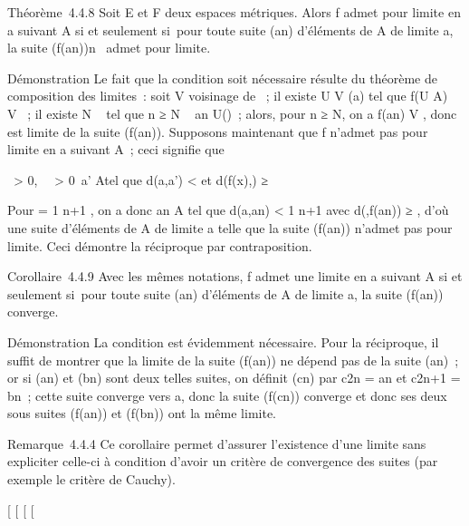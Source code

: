 Théorème~4.4.8 Soit E et F deux espaces métriques. Alors f admet \ell pour
limite en a suivant A si et seulement si~pour toute suite (an)
d'éléments de A de limite a, la suite (f(an))n\in{}~
admet \ell pour limite.

Démonstration Le fait que la condition soit nécessaire résulte du
théorème de composition des limites~: soit V voisinage de \ell~; il existe
U \in V (a) tel que f(U \bigcap A) \subset~ V ~; il existe N \in {}~ tel que n ≥ N \rigtharrow~
an \in U(\bigcapA)~; alors, pour n ≥ N, on a f(an) \in V ,
donc \ell est limite de la suite (f(an)). Supposons maintenant
que f n'admet pas \ell pour limite en a suivant A~; ceci signifie que

\exists~\epsilon \textgreater{} 0,
\forall~~\eta \textgreater{}
0\exists~a' \in A\text tel que
d(a,a') \textless{} \eta\text et d(f(x),\ell) ≥ \epsilon

Pour \eta = 1 \over n+1 , on a donc an \in A tel
que d(a,an) \textless{} 1 \over n+1 avec
d(\ell,f(an)) ≥ \epsilon, d'où une suite d'éléments de A de limite a
telle que la suite (f(an)) n'admet pas \ell pour limite. Ceci
démontre la réciproque par contraposition.

Corollaire~4.4.9 Avec les mêmes notations, f admet une limite en a
suivant A si et seulement si~pour toute suite (an) d'éléments
de A de limite a, la suite (f(an)) converge.

Démonstration La condition est évidemment nécessaire. Pour la
réciproque, il suffit de montrer que la limite de la suite
(f(an)) ne dépend pas de la suite (an)~; or si
(an) et (bn) sont deux telles suites, on définit
(cn) par c2n = an et c2n+1 =
bn~; cette suite converge vers a, donc la suite
(f(cn)) converge et donc ses deux sous suites
(f(an)) et (f(bn)) ont la même limite.

Remarque~4.4.4 Ce corollaire permet d'assurer l'existence d'une limite
sans expliciter celle-ci à condition d'avoir un critère de convergence
des suites (par exemple le critère de Cauchy).

{[}
{[}
{[}
{[}
